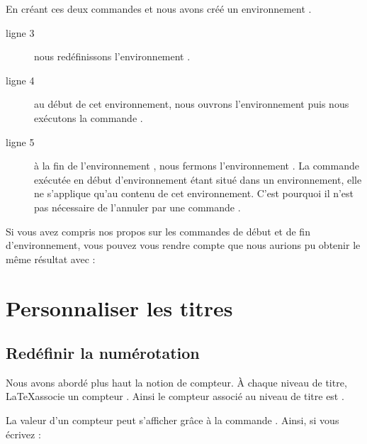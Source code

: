 En créant ces deux commandes  et  nous avons créé un environnement .

\begin{description}
\item[ligne 3]nous redéfinissons l'environnement .
\item[ligne 4]au début de cet environnement, nous ouvrons l'environnement  puis nous exécutons la commande .
\item[ligne 5]à la fin de l'environnement , nous fermons l'environnement . La commande  exécutée en début d'environnement étant situé dans un environnement, elle ne s'applique qu'au contenu de cet environnement. C'est pourquoi il n'est pas nécessaire de l'annuler par une commande . 
\end{description}

\begin{plusloins}
Si vous avez compris nos propos sur les commandes de début et de fin d'environnement, vous pouvez vous rendre compte que nous aurions pu obtenir le même résultat avec :

\begin{latexcode}
\let\oldquotation\quotation
\let\endoldquotation\endquotation
\renewcommand{\quotation}{\oldquotation\singlespace}
\renewcommand{\endquotation}{\endoldquotation}
\end{latexcode}

\end{plusloins}

\section{Personnaliser les titres}

\subsection{Redéfinir la numérotation}\label{apparencecompteur}
Nous avons abordé plus haut la notion de compteur. À chaque niveau de titre, \LaTeX associe un compteur . Ainsi le compteur associé au niveau de titre  est .

La valeur d'un compteur peut s'afficher grâce à la commande . Ainsi, si vous écrivez :
 
